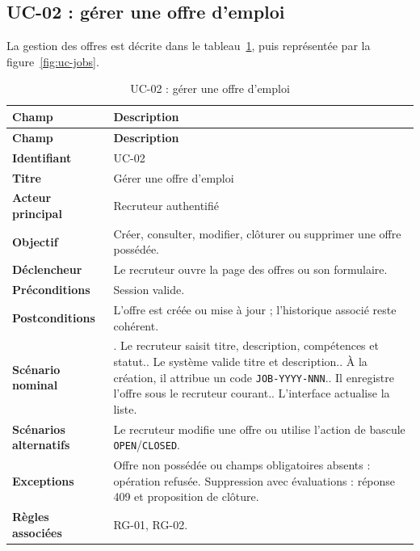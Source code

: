 \subsection{UC-02 : gérer une offre d'emploi}
La gestion des offres est décrite dans le tableau~\ref{tab:uc02}, puis représentée par la figure~\ref{fig:uc-jobs}.

{\small
\begin{longtable}{|>{\raggedright\arraybackslash\bfseries}p{}|>{\raggedright\arraybackslash}p{}|}
\caption{UC-02 : gérer une offre d'emploi}\label{tab:uc02}\\
\hline
\textbf{Champ} & \textbf{Description}\\
\hline
\endfirsthead
\hline
\textbf{Champ} & \textbf{Description}\\
\hline
\endhead
Identifiant & UC-02\\
\hline
Titre & Gérer une offre d'emploi\\
\hline
Acteur principal & Recruteur authentifié\\
\hline
Objectif & Créer, consulter, modifier, clôturer ou supprimer une offre possédée.\\
\hline
Déclencheur & Le recruteur ouvre la page des offres ou son formulaire.\\
\hline
Préconditions & Session valide.\\
\hline
Postconditions & L'offre est créée ou mise à jour ; l'historique associé reste cohérent.\\
\hline
Scénario nominal & 1. Le recruteur saisit titre, description, compétences et statut.\newline 2. Le système valide titre et description.\newline 3. À la création, il attribue un code \texttt{JOB-YYYY-NNN}.\newline 4. Il enregistre l'offre sous le recruteur courant.\newline 5. L'interface actualise la liste.\\
\hline
Scénarios alternatifs & Le recruteur modifie une offre ou utilise l'action de bascule \texttt{OPEN}/\texttt{CLOSED}.\\
\hline
Exceptions & Offre non possédée ou champs obligatoires absents : opération refusée. Suppression avec évaluations : réponse 409 et proposition de clôture.\\
\hline
Règles associées & RG-01, RG-02.\\
\hline
\end{longtable}}

